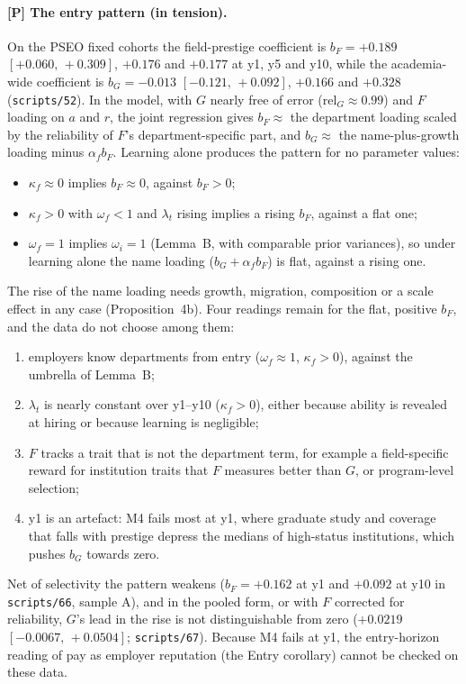\documentclass[11pt]{article}
\newcommand{\ci}[2]{$[#1,\allowbreak\,#2]$}
\begin{document}
\paragraph{[P] The entry pattern (in tension).} On the PSEO fixed cohorts the field-prestige coefficient is
$b_F=+0.189$ \ci{+0.060}{+0.309}, $+0.176$ and $+0.177$ at y1, y5 and y10, while the academia-wide coefficient is
$b_G=-0.013$ \ci{-0.121}{+0.092}, $+0.166$ and $+0.328$ (\texttt{scripts/52}). In the model, with $G$ nearly free of
error ($\mathrm{rel}_G\approx0.99$) and $F$ loading on $a$ and $r$, the joint regression gives $b_F\approx$ the
department loading scaled by the reliability of $F$'s department-specific part, and $b_G\approx$ the name-plus-growth
loading minus $\alpha_f b_F$. Learning alone produces the pattern for no parameter values:
\begin{itemize}
\item $\kappa_f\approx0$ implies $b_F\approx0$, against $b_F>0$;
\item $\kappa_f>0$ with $\omega_f<1$ and $\lambda_t$ rising implies a rising $b_F$, against a flat one;
\item $\omega_f=1$ implies $\omega_i=1$ (Lemma~B, with comparable prior variances), so under learning alone the
name loading ($b_G+\alpha_fb_F$) is flat, against a rising one.
\end{itemize}
The rise of the name loading needs growth, migration, composition or a scale effect in any case
(Proposition~4b). Four readings remain for the flat, positive $b_F$, and the data do not choose among them:
\begin{enumerate}
\item employers know departments from entry ($\omega_f\approx1$, $\kappa_f>0$), against the umbrella of Lemma~B;
\item $\lambda_t$ is nearly constant over y1--y10 ($\kappa_f>0$), either because ability is revealed at hiring
\citep{arcidiacono2010beyond} or because learning is negligible;
\item $F$ tracks a trait that is not the department term, for example a field-specific reward for institution
traits that $F$ measures better than $G$, or program-level selection;
\item y1 is an artefact: M4 fails most at y1, where graduate study and coverage that falls with prestige depress
the medians of high-status institutions, which pushes $b_G$ towards zero.
\end{enumerate}
Net of selectivity the pattern weakens ($b_F=+0.162$ at y1 and $+0.092$ at y10 in \texttt{scripts/66}, sample A),
and in the pooled form, or with $F$ corrected for reliability, $G$'s lead in the rise is not distinguishable from
zero ($+0.0219$ \ci{-0.0067}{+0.0504}; \texttt{scripts/67}). Because M4 fails at y1, the entry-horizon reading of
pay as employer reputation (the Entry corollary) cannot be checked on these data.
\end{document}
